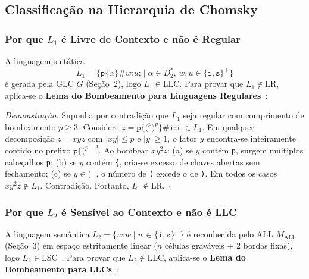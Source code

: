 \subsection{Classificação na Hierarquia de Chomsky}

\subsubsection{Por que $L_1$ é Livre de Contexto e não é Regular}

A linguagem sintática
\[
L_1 = \{ \texttt{p\{}\alpha\texttt{\}\#}w\texttt{:}u\texttt{;} \mid \alpha \in D_2^*, \, w, u \in \{\texttt{i}, \texttt{s}\}^+ \}
\]
é gerada pela GLC $G$ (Seção~2), logo $L_1 \in \text{LLC}$. Para provar que $L_1 \notin \text{LR}$, aplica-se o \textbf{Lema do Bombeamento para Linguagens Regulares}~\cite{sipser,hopcroft}:

\textit{Demonstração.} Suponha por contradição que $L_1$ seja regular com comprimento de bombeamento $p \ge 3$. Considere $z = \texttt{p\{(}^p\texttt{)}^p\texttt{\}\#i:i;} \in L_1$. Em qualquer decomposição $z = xyz$ com $|xy| \le p$ e $|y| \ge 1$, o fator $y$ encontra-se inteiramente contido no prefixo $\texttt{p\{(}^{p-2}$. Ao bombear $xy^2z$: (a) se $y$ contém \texttt{p}, surgem múltiplos cabeçalhos \texttt{p}; (b) se $y$ contém \texttt{\{}, cria-se excesso de chaves abertas sem fechamento; (c) se $y \in \texttt{(}^+$, o número de \texttt{(} excede o de \texttt{)}. Em todos os casos $xy^2z \notin L_1$. Contradição. Portanto, $L_1 \notin \text{LR}$. \hfill $\square$

\subsubsection{Por que $L_2$ é Sensível ao Contexto e não é LLC}

A linguagem semântica $L_2 = \{ w\texttt{:}w \mid w \in \{\texttt{i}, \texttt{s}\}^+ \}$ é reconhecida pelo ALL $M_{\text{ALL}}$ (Seção~3) em espaço estritamente linear ($n$ células graváveis + 2 bordas fixas), logo $L_2 \in \text{LSC}$~\cite{hopcroft}. Para provar que $L_2 \notin \text{LLC}$, aplica-se o \textbf{Lema do Bombeamento para LLCs}~\cite{sipser}:

